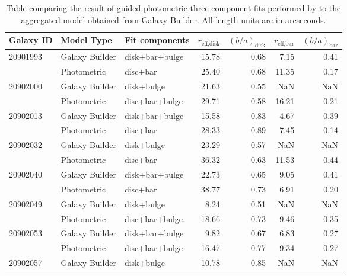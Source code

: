 \documentclass[../main.tex]{subfiles}
\begin{document}
\begin{table}
  \label{table:sandor-fits}
  \caption{Table comparing the result of guided photometric three-component fits performed by \citet{Kruk2017:1710.00093v2} to the aggregated model obtained from Galaxy Builder. All length units are in arcseconds.  }
  \centering
  \begin{tabular}{lllrrrr}
  Galaxy ID & Model Type & Fit components & $r_\text{eff,disk}$ & $(b / a)_\text{disk}$ & $r_\text{eff,bar}$  & $(b / a)_\text{bar}$ \\
  \hline
  20901993 & Galaxy Builder &  disk+bar+bulge &    15.78 &     0.68 &    7.15 &    0.41 \\
           & Photometric    &        disc+bar &    25.40 &     0.68 &   11.35 &    0.17 \\
  20902000 & Galaxy Builder &      disk+bulge &    21.63 &     0.55 &     NaN &     NaN \\
           & Photometric    &  disc+bar+bulge &    29.71 &     0.58 &   16.21 &    0.21 \\
  20902013 & Galaxy Builder &  disk+bar+bulge &    15.58 &     0.83 &    4.67 &    0.39 \\
           & Photometric    &        disc+bar &    28.33 &     0.89 &    7.45 &    0.14 \\
  20902032 & Galaxy Builder &      disk+bulge &    23.29 &     0.57 &     NaN &     NaN \\
           & Photometric    &        disc+bar &    36.32 &     0.63 &   11.53 &    0.44 \\
  20902040 & Galaxy Builder &  disk+bar+bulge &    22.73 &     0.65 &    9.05 &    0.41 \\
           & Photometric    &        disc+bar &    38.77 &     0.73 &    6.91 &    0.20 \\
  20902049 & Galaxy Builder &      disk+bulge &     8.24 &     0.51 &     NaN &     NaN \\
           & Photometric    &  disc+bar+bulge &    18.66 &     0.73 &    9.46 &    0.35 \\
  20902053 & Galaxy Builder &  disk+bar+bulge &     9.82 &     0.67 &    6.83 &    0.27 \\
           & Photometric    &  disc+bar+bulge &    16.47 &     0.77 &    9.34 &    0.27 \\
  20902057 & Galaxy Builder &      disk+bulge &    10.78 &     0.85 &     NaN &     NaN \\

\end{tabular}
\end{table}
\end{document}
